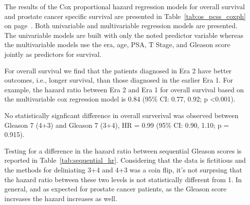 % 

The results of the Cox proportional hazard regression models for overall
survival and prostate cancer specific survival are presented in
Table~\ref{tab:os_pcss_coxph} on page~\pageref{tab:os_pcss_coxph}.  Both
univariable and multivariable regression models are presented.  The univariable
models are built with only the noted predictor variable whereas the
multivariable models use the era, age, PSA, T Stage, and Gleason score jointly
as predictors for survival.




For overall survival we find that the patients diagnosed in Era 2
have better outcomes, i.e., longer survival, than those diagnosed
in the earlier Era 1.  For example, the hazard ratio between Era 2 and Era 1 for
overall survival based on the multivariable cox regression model is
0.84 (95\% CI: 0.77, 0.92; p \textless 0.001).

No statistically signficant difference in overall surverival was observed
between Gleason 7 (4+3) and Gleason 7 (3+4), HR = 0.99 (95\% CI: 0.90, 1.10; p = 0.915).  

Testing for a difference in the hazard ratio between sequential Gleason scores
is reported in Table~\ref{tab:sequential_hr}.  Considering that the data is
fictitious and the methods for deliniating 3+4 and 4+3 was a coin flip, it's not
surprsing that the hazard ratio between these two levels is not statistically
different from 1.  In general, and as expected for prostate cancer patients, as
the Gleason score increases the hazard increases as well.











